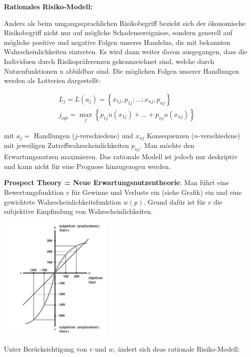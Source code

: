 \documentclass[9pt, landscape, fleqn]{scrartcl}
\begin{document}
\begin{multicols*}{3}
\textbf{Rationales Risiko-Modell:}

Anders als beim umgangssprachlichen Risikobegriff bezieht sich der ökonomische Risikobegriff nicht nur auf mögliche Schadensereignisse, sondern generell auf mögliche positive und negative Folgen unseres Handelns, die mit bekannten Wahrscheinlichkeiten eintreten. Es wird dann weiter davon ausgegangen, dass die Individuen durch Risikopräferenzen gekennzeichnet sind, welche durch Nutzenfunktionen u abbildbar sind. Die möglichen Folgen unserer Handlungen werden als Lotterien dargestellt:

\begin{align}
    L_j = L(a_j) = \left\{ x_{1j}, p_{1j};...;x_{nj},p_{nj}\right\} \\ 
    j_{opt} = \max\limits_j \left\{ p_{1j}u(x_{1j})+...+p_{nj}u(x_{nj})\right\} 
\end{align}

mit $a_j=$ Handlungen ($j$-verschiedene) und $x_{nj}$ Konsequenzen ($n$-verschiedene) mit jeweiligen Zutreffwahrscheinlichkeiten $p_{nj}$. Man möchte den Erwartungsnutzen maximieren. Das rationale Modell ist jedoch nur deskriptiv und kann nicht für eine Prognose hinzugezogen werden.  \\ \newline

\textbf{Prospect Theory = Neue Erwartungsnutzentheorie}: Man führt eine Bewertungsfunktion $v$ für Gewinne und Verluste ein (siehe Grafik) ein und eine gewichtete Wahrscheinlichkeitsfunktion $w(p)$. Grund dafür ist für $v$ die subjektive Empfindung von Wahrscheinlichkeiten.

\begin{center}
    \includegraphics[width=5.5cm]{Bewertung_von_Gewinn_u_Verlust.png}
\end{center}

Unter Berücksichtigung von $v$ und $w$, ändert sich deas rationale Risiko-Modell:


\end{multicols*}
\end{document}
